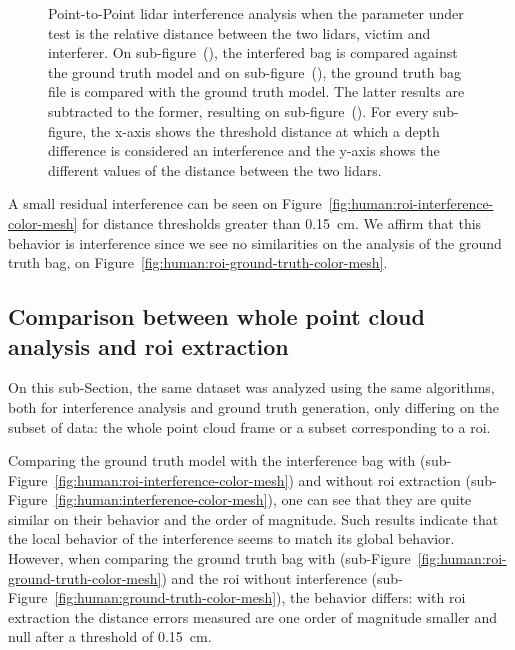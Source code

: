 \begin{figure}[p]
	\caption[Point-to-Point analysis of the interference on the seleced \ac{roi} of the \textit{Human} dataset. Results are presented for the ground-truth bag, interference bag and the subtraction of the results between the two.]{Point-to-Point \ac{lidar} interference analysis when the parameter under test is the relative distance between the two \acp{lidar}, victim and interferer. On sub-figure~(), the interfered bag is compared against the ground truth model and on sub-figure~(), the ground truth bag file is compared with the ground truth model. The latter results are subtracted to the former, resulting on sub-figure~(). For every sub-figure, the x-axis shows the threshold distance at which a depth difference is considered an interference and the y-axis shows the different values of the distance between the two \acp{lidar}.} 
	\label{fig:human:roi-color-mesh}
\end{figure}

A small residual interference can be seen on Figure~\ref{fig:human:roi-interference-color-mesh} for distance thresholds greater than \SI{0.15}{\centi\meter}. We affirm that this behavior is interference since we see no similarities on the analysis of the ground truth bag, on Figure~\ref{fig:human:roi-ground-truth-color-mesh}.

\subsection{Comparison between whole point cloud analysis and \ac{roi} extraction}
On this sub-Section, the same dataset was analyzed using the same algorithms, both for interference analysis and ground truth generation, only differing on the subset of data: the whole point cloud frame or a subset corresponding to a \ac{roi}.

Comparing the ground truth model with the interference bag with (sub-Figure~\ref{fig:human:roi-interference-color-mesh}) and without \ac{roi} extraction (sub-Figure~\ref{fig:human:interference-color-mesh}), one can see that they are quite similar on their behavior and the order of magnitude. Such results indicate that the local behavior of the interference seems to match its global behavior. However, when comparing the ground truth bag with (sub-Figure~\ref{fig:human:roi-ground-truth-color-mesh}) and the \ac{roi} without interference (sub-Figure~\ref{fig:human:ground-truth-color-mesh}), the behavior differs: with \ac{roi} extraction the distance errors measured are one order of magnitude smaller and null after a threshold of \SI{0.15}{\centi\meter}. 

